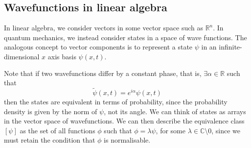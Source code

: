 \subsection{Wavefunctions in linear algebra}
In linear algebra, we consider vectors in some vector space such as \( \mathbb R^n \).
In quantum mechanics, we instead consider states in a space of wave functions.
The analogous concept to vector components is to represent a state \( \psi \) in an infinite-dimensional \( x \) axis basis \( \psi(x,t) \).

Note that if two wavefunctions differ by a constant phase, that is, \( \exists \alpha \in \mathbb R \) such that
\[
	\widetilde \psi(x,t) = e^{i \alpha} \psi(x,t)
\]
then the states are equivalent in terms of probability, since the probability density is given by the norm of \( \psi \), not its angle.
We can think of states as arrays in the vector space of wavefunctions.
We can then describe the equivalence class \( [\psi] \) as the set of all functions \( \phi \) such that \( \phi = \lambda \psi \), for some \( \lambda \in \mathbb C \setminus \qty{0} \), since we must retain the condition that \( \phi \) is normalisable.

